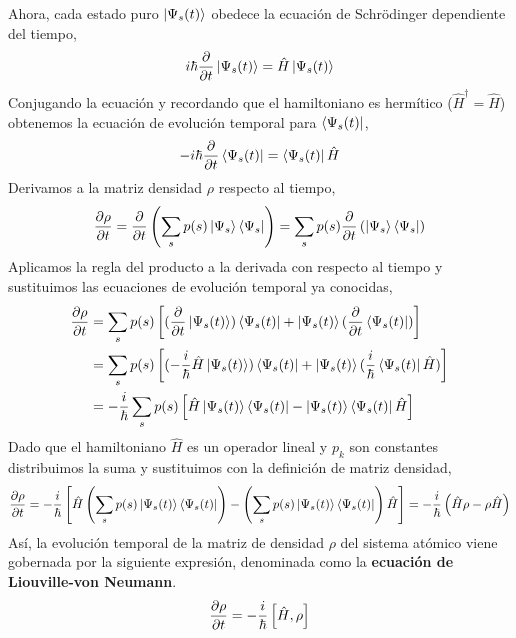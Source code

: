 Ahora, cada estado puro $\ket{\Psi_s(t)}$ obedece la ecuación de Schrödinger dependiente del tiempo,
\begin{equation}
    i \hbar \pdv{}{t} \ket{\Psi_s(t)} = \hat{H} \ket{\Psi_s(t)}
\end{equation}
Conjugando la ecuación y recordando que el hamiltoniano es hermítico ($\hat{H}^{\dagger} = \hat{H}$) obtenemos la ecuación de evolución temporal para $\bra{\Psi_s(t)}$,
\begin{equation}
    -i \hbar \pdv{}{t} \bra{\Psi_s(t)} =  \bra{\Psi_s(t)} \hat{H}
\end{equation}
Derivamos a la matriz densidad $\rho$ respecto al tiempo,
\begin{equation}
    \pdv{\rho}{t} = \pdv{}{t}\left( \sum_s p(s) \ket{\Psi_s}\bra{\Psi_s} \right) = \sum_s p(s) \pdv{}{t} \left( \ket{\Psi_s}\bra{\Psi_s} \right)
\end{equation}
Aplicamos la regla del producto a la derivada con respecto al tiempo y sustituimos las ecuaciones de evolución temporal ya conocidas,
\begin{equation}
\begin{split}
    \pdv{\rho}{t} &= \sum_s p(s) \left[ (\pdv{}{t} \ket{\Psi_s(t)})\bra{\Psi_s(t)} + \ket{\Psi_s(t)}(\pdv{}{t} \bra{\Psi_s(t)})\right]\\
    &= \sum_s p(s) \left[ (-\frac{i}{\hbar} \hat{H}\ket{\Psi_s(t)})\bra{\Psi_s(t)} +  \ket{\Psi_s(t)} (\frac{i}{\hbar} \bra{\Psi_s(t)} \hat{H} )\right]\\
    &= -\frac{i}{\hbar} \sum_s p(s) \left[\hat{H}\ket{\Psi_s(t)}\bra{\Psi_s(t)} - \ket{\Psi_s(t)} \bra{\Psi_s(t)}\hat{H} \right] 
\end{split}
\end{equation}
Dado que el hamiltoniano $\hat{H}$ es un operador lineal y $p_k$ son constantes distribuimos la suma y sustituimos con la definición de matriz densidad,
\begin{equation}
    \pdv{\rho}{t} = -\frac{i}{\hbar} \left[\hat{H} \left(\sum_s p(s) \ket{\Psi_s(t)}\bra{\Psi_s(t)} \right) - \left( \sum_s p(s) \ket{\Psi_s(t)} \bra{\Psi_s(t)} \right) \hat{H} \right] = -\frac{i}{\hbar} \left(\hat{H} \rho - \rho \hat{H} \right)  
\end{equation}
Así, la evolución temporal de la matriz de densidad $\rho$ del sistema atómico viene gobernada por la siguiente expresión, denominada como la \textbf{ecuación de Liouville-von Neumann}.
\begin{equation}
    \pdv{\rho}{t} = -\frac{i}{\hbar} \left[\hat{H}, \rho\right]
\end{equation}
